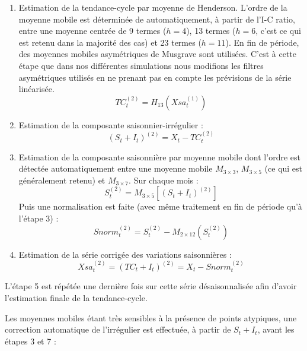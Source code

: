 \documentclass[
  11pt,
  french,
  a4paper]{article}
\newcommand\1{\mathds{1}}
\begin{document}
\begin{enumerate}
\def\labelenumi{\arabic{enumi}.}
\setcounter{enumi}{4}
\item
  Estimation de la tendance-cycle par moyenne de Henderson.
  L'ordre de la moyenne mobile est déterminée de automatiquement, à partir de l'I-C ratio, entre une moyenne centrée de 9 termes (\(h=4\)), 13 termes (\(h=6\), c'est ce qui est retenu dans la majorité des cas) et 23 termes (\(h=11\)).
  En fin de période, des moyennes mobiles asymétriques de Musgrave sont utilisées.
  C'est à cette étape que dans nos différentes simulations nous modifions les filtres asymétriques utilisés en ne prenant pas en compte les prévisions de la série linéarisée.
  \[
  TC_t^{(2)}=H_{13}(Xsa_t^{(1)})
  \]
\item
  Estimation de la composante saisonnier-irrégulier :
  \[
  (S_t+I_t)^{(2)}= X_t - TC_t^{(2)}
  \]
\item
  Estimation de la composante saisonnière par moyenne mobile dont l'ordre est détectée automatiquement entre une moyenne mobile \(M_{3\times 3}\), \(M_{3\times 5}\) (ce qui est généralement retenu) et \(M_{3\times 7}\).
  Sur chaque mois :
  \[
  S_t^{(2)}= M_{3\times 5}\left[(S_t+I_t)^{(2)}\right]
  \]
  Puis une normalisation est faite (avec même traitement en fin de période qu'à l'étape 3) :
  \[
  Snorm_t^{(2)}=S_t^{(2)} - M_{2\times 12}\left(S_t^{(2)}\right)
  \]
\item
  Estimation de la série corrigée des variations saisonnières :
  \[
  Xsa_t^{(2)}= (TC_t+I_t)^{(2)} = X_t - Snorm_t^{(2)}
  \]
\end{enumerate}

L'étape 5 est répétée une dernière fois sur cette série désaisonnalisée afin d'avoir l'estimation finale de la tendance-cycle.

Les moyennes mobiles étant très sensibles à la présence de points atypiques, une correction automatique de l'irrégulier est effectuée, à partir de \(S_t+I_t\), avant les étapes 3 et 7 :
\end{document}
